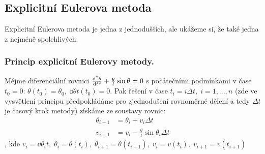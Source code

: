 \documentclass[reqno, a4paper]{amsart}
\begin{document}
		\subsection{Explicitní Eulerova metoda}
		Explicitní Eulerova metoda je jedna z jednodušších, ale ukážeme si, že také jedna z nejméně spolehlivých.
		\\
		\subsubsection{Princip explicitní Eulerovy metody.} Mějme diferenciální rovnici $\frac{\mathrm{d}^2 {\theta}}{\mathrm{d} {t}^2} + \frac{g}{l} \sin \theta = 0$ s počátečními podmínkami v čase $t_{0}=0$: $\theta(t_{0})=\theta_{0},\; \dd{\theta}{t}(t_{0})=0$. Pak řešení v čase $t_{i}=i\Delta t,\; i=1,...,n$ (zde ve vysvětlení principu předpokládáme pro zjednodušení rovnoměrné dělení a tedy $ \Delta t$ je časový krok metody) získáme ze soustavy rovnic: 
		\begin{align}
			\theta_{i+1}& =\theta_{i}+v_{i}\Delta t\\
			v_{i+1}& =v_{i}-\frac{g}{l}\sin\theta_{i}\Delta t
		\end{align}
		, kde $ v_{i}=\dd{\theta_{i}}{t},\; \theta_{i}=\theta(t_{i}),\;\theta_{i+1}=\theta(t_{i+1}),\;v_{i}=v(t_{i}),\;v_{i+1}=v(t_{i+1})$
		\\
\end{document}
